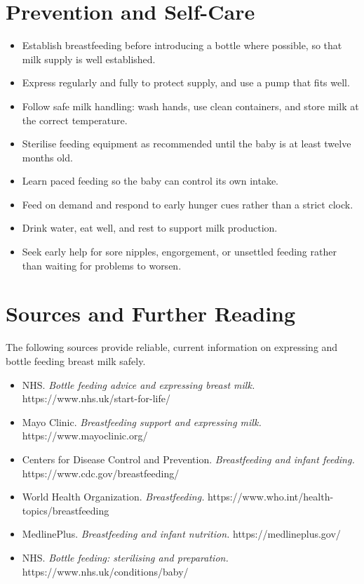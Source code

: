 \section*{Prevention and Self-Care}
\begin{itemize}
    \item Establish breastfeeding before introducing a bottle where possible, so that milk supply is well established.
    \item Express regularly and fully to protect supply, and use a pump that fits well.
    \item Follow safe milk handling: wash hands, use clean containers, and store milk at the correct temperature.
    \item Sterilise feeding equipment as recommended until the baby is at least twelve months old.
    \item Learn paced feeding so the baby can control its own intake.
    \item Feed on demand and respond to early hunger cues rather than a strict clock.
    \item Drink water, eat well, and rest to support milk production.
    \item Seek early help for sore nipples, engorgement, or unsettled feeding rather than waiting for problems to worsen.
\end{itemize}

\section*{Sources and Further Reading}
The following sources provide reliable, current information on expressing and bottle feeding breast milk safely.
\begin{itemize}
    \item NHS. \textit{Bottle feeding advice and expressing breast milk.} https://www.nhs.uk/start-for-life/
    \item Mayo Clinic. \textit{Breastfeeding support and expressing milk.} https://www.mayoclinic.org/
    \item Centers for Disease Control and Prevention. \textit{Breastfeeding and infant feeding.} https://www.cdc.gov/breastfeeding/
    \item World Health Organization. \textit{Breastfeeding.} https://www.who.int/health-topics/breastfeeding
    \item MedlinePlus. \textit{Breastfeeding and infant nutrition.} https://medlineplus.gov/
    \item NHS. \textit{Bottle feeding: sterilising and preparation.} https://www.nhs.uk/conditions/baby/
\end{itemize}
